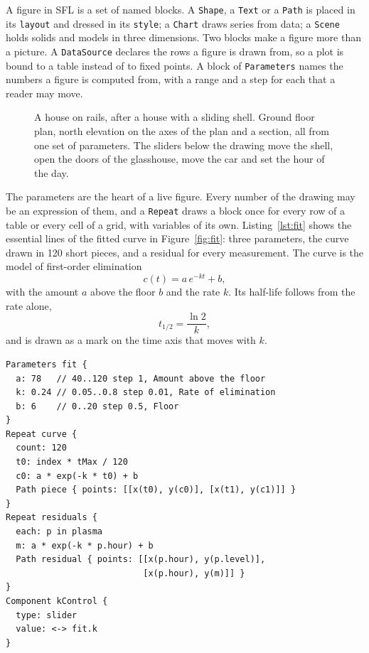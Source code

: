 \documentclass[10pt,twocolumn]{article}
\newcommand\figurehint{%
  \par\vspace{4pt}\hfill\sflhint[\textcolor{hint}{\itshape\footnotesize Interactive figure: open this PDF with the stickyflow
  extension}]\par\smallskip}
\begin{document}
A figure in SFL is a set of named blocks. A \texttt{Shape}, a \texttt{Text} or a \texttt{Path} is placed in its \texttt{layout} and
dressed in its \texttt{style}; a \texttt{Chart} draws series from data; a \texttt{Scene} holds solids and models in three dimensions.
Two blocks make a figure more than a picture. A \texttt{DataSource} declares the rows a figure is drawn from, so a plot is bound to a
table instead of to fixed points. A block of \texttt{Parameters} names the numbers a figure is computed from, with a range and a step
for each that a reader may move.

\begin{figure}[t]
\figurehint
\centering
{}
\caption{A house on rails, after a house with a sliding shell. Ground floor plan, north elevation on the axes of the plan and a section,
all from one set of parameters. The sliders below the drawing move the shell, open the doors of the glasshouse, move the car and set
the hour of the day.}
\label{fig:house}
\end{figure}

The parameters are the heart of a live figure. Every number of the drawing may be an expression of them, and a \texttt{Repeat} draws a
block once for every row of a table or every cell of a grid, with variables of its own. Listing~\ref{lst:fit} shows the essential
lines of the fitted curve in Figure~\ref{fig:fit}: three parameters, the curve drawn in 120 short pieces, and a residual for every
measurement. The curve is the model of first-order elimination
\begin{equation}
  c(t) = a\, e^{-k t} + b ,
  \label{eq:model}
\end{equation}
with the amount $a$ above the floor $b$ and the rate $k$. Its half-life follows from the rate alone,
\begin{equation}
  t_{1/2} = \frac{\ln 2}{k} ,
  \label{eq:half}
\end{equation}
and is drawn as a mark on the time axis that moves with $k$.

\begin{lstlisting}[caption={The parameters of the fitted curve, the curve in short pieces, and a residual for every row of the table. A slider writes a parameter, and the figure is made again from its source.},label={lst:fit}]
Parameters fit {
  a: 78   // 40..120 step 1, Amount above the floor
  k: 0.24 // 0.05..0.8 step 0.01, Rate of elimination
  b: 6    // 0..20 step 0.5, Floor
}
Repeat curve {
  count: 120
  t0: index * tMax / 120
  c0: a * exp(-k * t0) + b
  Path piece { points: [[x(t0), y(c0)], [x(t1), y(c1)]] }
}
Repeat residuals {
  each: p in plasma
  m: a * exp(-k * p.hour) + b
  Path residual { points: [[x(p.hour), y(p.level)],
                           [x(p.hour), y(m)]] }
}
Component kControl {
  type: slider
  value: <-> fit.k
}
\end{lstlisting}
\end{document}
